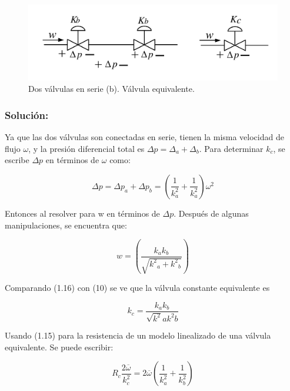 \documentclass[a4paper,12pt,twoside]{proyectotanquesecci}
\begin{document}
\begin{figure}[h]
\centering
\includegraphics[scale=0.5]{Figura6}
\renewcommand{\figurename}{Fig.}
\caption{Dos válvulas en serie (b). Válvula equivalente.}
\label{Dos válvulas en serie (b). Válvula equivalente.}
\end{figure}

\subsubsection{Solución:}

Ya que las dos válvulas son conectadas en serie, tienen la misma velocidad de flujo $\omega$, y la presión diferencial total es $\Delta p = \Delta_{a}+\Delta_{b}$. Para determinar $k_{c}$, se escribe $\Delta p$ en términos de $\omega$ como:

\begin{equation}
\Delta p= \Delta p_{a}+\Delta p_{b} 
=(\frac{1}{k^{2}_{a}}+\frac{1}{k^{2}_{a}})\omega^{2}
\end{equation}

Entonces al resolver para w en términos de $\Delta p$. Después de algunas manipulaciones, se encuentra que:

\begin{equation}
w=(\frac{{k_{a}k_{b}}}{\sqrt{{k^{2}}_{a}+{k^{2}}_{b}}})
\end{equation}

Comparando (1.16) con (10) se ve que la válvula constante equivalente es

\begin{equation}
k_{c}=\frac{k_{a} k_{b}}{\sqrt{k^{2}}a{k^{2}}b}
\end{equation}

Usando (1.15) para la resistencia  de un modelo linealizado de una válvula equivalente. Se puede escribir:

\begin{equation}
R_{c}\frac{2\overline{\omega}}{k^{2}_{c}}=
2\overline{\omega}(\frac{1}{k^{2}_{a}}+\frac{1}{k^{2}_{b}})
\end{equation}
\end{document}
